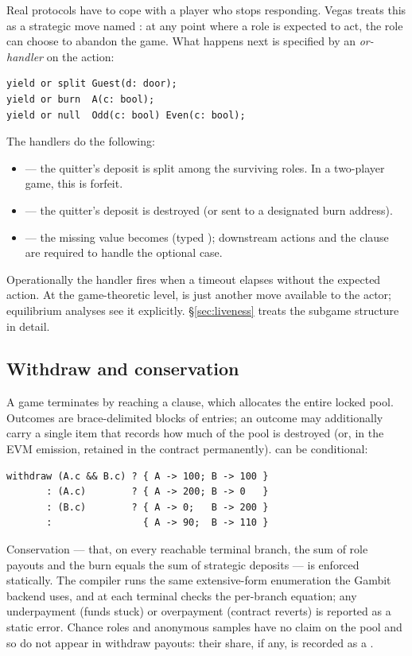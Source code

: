 Real protocols have to cope with a player who stops responding.
Vegas treats this as a strategic move named : at any point
where a role is expected to act, the role can choose to abandon the
game.  What happens next is specified by an \emph{or-handler} on
the action:
\begin{lstlisting}[style=vg]
yield or split Guest(d: door);
yield or burn  A(c: bool);
yield or null  Odd(c: bool) Even(c: bool);
\end{lstlisting}
The handlers do the following:
\begin{itemize}\itemsep1pt
\item {} --- the quitter's deposit is split among the
  surviving roles.  In a two-player game, this is forfeit.
\item {} --- the quitter's deposit is destroyed (or sent to
  a designated burn address).
\item {} --- the missing value becomes  (typed
  ); downstream actions and the  clause are
  required to handle the optional case.
\end{itemize}
Operationally the handler fires when a timeout elapses without the
expected action.  At the game-theoretic level,  is just
another move available to the actor; equilibrium analyses see it
explicitly.  \S\ref{sec:liveness} treats the subgame structure in
detail.

\subsection{Withdraw and conservation}

A game terminates by reaching a  clause, which
allocates the entire locked pool.  Outcomes are
brace-delimited blocks of  entries; an outcome
may additionally carry a single  item that records
how much of the pool is destroyed (or, in the EVM emission,
retained in the contract permanently).   can be
conditional:
\begin{lstlisting}[style=vg]
withdraw (A.c && B.c) ? { A -> 100; B -> 100 }
       : (A.c)        ? { A -> 200; B -> 0   }
       : (B.c)        ? { A -> 0;   B -> 200 }
       :                { A -> 90;  B -> 110 }
\end{lstlisting}
Conservation --- that, on every reachable terminal branch, the
sum of role payouts and the burn equals the sum of strategic
deposits --- is enforced statically.  The compiler runs the same
extensive-form enumeration the Gambit backend uses, and at each
terminal checks the per-branch equation; any underpayment (funds
stuck) or overpayment (contract reverts) is reported as a static
error.  Chance roles and anonymous samples have no claim on the
pool and so do not appear in withdraw payouts: their share, if
any, is recorded as a .

